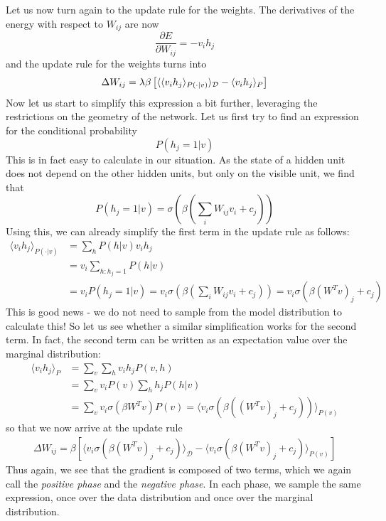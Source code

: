 \documentclass[a4paper, draft]{article}
\theoremstyle{own}
\theoremstyle{remark}
\begin{document}
Let us now turn again to the update rule for the weights.
The derivatives of the energy with respect to $W_{ij}$ are now
$$
\frac{\partial E}{\partial W_{ij}} = - v_i h_j
$$
and the update rule for the weights turns into
$$
\Delta W_{ij} = \\
 \lambda \beta \left[
\langle \langle  v_i h_j \rangle_{P(\cdot | v)} \rangle_{\mathcal D} 
- 
\langle v_i h_j \rangle_P  
\right] 
$$
Now let us start to simplify this expression a bit further, leveraging the restrictions on the geometry of the network. Let us first try to find an expression for the conditional probability
$$
P(h_j = 1 | v)
$$
This is in fact easy to calculate in our situation. As the state of a hidden unit does not depend on the other hidden units, but only on the visible unit, we find that
$$
P(h_j = 1 | v)=  \sigma(\beta (\sum_i W_{ij} v_i + c_j)) 
$$
Using this, we can already simplify the first term in the update rule as follows:
\begin{align*}
\langle v_i h_j \rangle_{P(\cdot | v)} &= \sum_h P(h | v) v_i h_j \\
&= v_i   \sum_{h : h_j = 1} P(h | v)   \\
&= v_i P(h_j = 1 | v) = v_i \sigma(\beta (\sum_i W_{ij} v_i + c_j)) 
= v_i \sigma(\beta (W^T v)_j + c_j)
\end{align*}
This is good news - we do not need to sample from the model distribution to calculate this! So let us see whether a similar simplification works for the second term.  In fact, the second term can be written as an expectation value over the marginal distribution:
\begin{align*}
\langle v_i h_j \rangle_P &= \sum_v \sum_h v_i h_j P(v,h) \\
&= \sum_v v_i P(v) \sum_h h_j P(h | v) \\
&= \sum_v v_i \sigma(\beta W^T v) P(v) = \langle v_i \sigma(\beta ((W^T v)_j + c_j)) \rangle_{P(v)}
\end{align*}
so that we now arrive at the update rule
\begin{align}\label{eq:rbmupdaterule}
\Delta W_{ij} = \beta \left[
\langle v_i \sigma(\beta (W^T v)_j + c_j) \rangle_{\mathcal D}
-
\langle v_i \sigma(\beta (W^T v)_j + c_j) \rangle_{P(v)}
\right]
\end{align}
Thus again, we see that the gradient is composed of two terms, which we again call the {\em positive phase} and the {\em negative phase}. In each phase, we sample the same expression, once over the data distribution and once over the marginal distribution.
\end{document}
